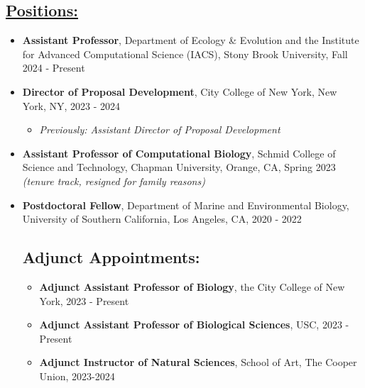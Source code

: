 \documentclass[]{res}
\begin{document}
 
 \small
{} %
 
 

\address{{\bf pronouns:} they/them/theirs {\emph{or}} she/her/hers\\ {\bf email:} jw4336@terpmail.umd.edu}
\address{{\bf website:} https://microbialgamut.com/}%

 
\begin{resume} 
 

 \section{\underline{Positions:}} %
\begin{itemize}[leftmargin=*]
\setlength\itemsep{0.5em}
\item[] {\bf Assistant Professor}, Department of Ecology \& Evolution and the Institute for Advanced Computational Science (IACS), Stony Brook University, Fall 2024 - Present
\item[] {\bf Director of Proposal Development}, City College of New York, New York, NY, 2023 - 2024
\begin{itemize}[leftmargin=*]
\item \emph{Previously: Assistant Director of Proposal Development}
\end{itemize}
\item[] {\bf Assistant Professor of Computational Biology}, Schmid College of Science and Technology, Chapman University, Orange, CA, Spring 2023 \emph{(tenure track, resigned for family reasons)}
\item[] {\bf Postdoctoral Fellow}, Department of Marine and Environmental Biology, University of Southern California, Los Angeles, CA, 2020 - 2022

 \section{Adjunct Appointments:}
\begin{itemize}[leftmargin=*]
\setlength\itemsep{0.5em}
\item[] {\bf Adjunct Assistant Professor of Biology}, the City College of New York, 2023 - Present
\item[] {\bf Adjunct Assistant Professor of Biological Sciences}, USC, 2023 - Present
\item[] {\bf Adjunct Instructor of Natural Sciences}, School of Art, The Cooper Union, 2023-2024
\end{itemize}


\end{itemize}
\end{resume}
\end{document}
